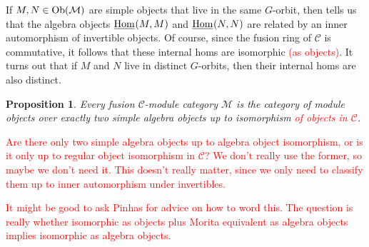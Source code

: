 \documentclass[12pt, reqno]{amsart}
\numberwithin{equation}{section}
\theoremstyle{plainspace}
\newtheorem{proposition}[theorem]{Proposition}
\theoremstyle{definitionspace}
\theoremstyle{remarkspace}
\newcommand{\mathcat}[1]{\mathcal{#1}}
\newcommand{\Ob}{\textup{Ob}}
\newcommand{\IntHom}[2][]{
	\ifthenelse{\equal{#2}{}}
		{\underline{\textup{Hom}}_{#1}}
		{\underline{\textup{Hom}}_{#1}\!\left(#2\right)}
}
\begin{document}
\newline

\noindent If $M, N \in \Ob(\mathcat{M})$ are simple objects that live in the same $G$-orbit, then \cite[Lemma 3.3]{Ostrik_2003} tells us that the algebra objects $\IntHom{M, M}$ and $\IntHom{N, N}$ are related by an inner automorphism of invertible objects. Of course, since the fusion ring of $\mathcat{C}$ is commutative, it follows that these internal homs are isomorphic \textcolor{red}{(as objects)}. It turns out that if $M$ and $N$ live in distinct $G$-orbits, then their internal homs are also distinct.
\newline

\begin{proposition}\label{prop:near-group_algebra_equivalence_classes}
Every fusion $\mathcat{C}$-module category $\mathcat{M}$ is the category of module objects over exactly two simple algebra objects up to isomorphism \textcolor{red}{of objects in $\mathcat{C}$}.
\end{proposition}
\leavevmode

\noindent \textcolor{red}{Are there only two simple algebra objects up to algebra object isomorphism, or is it only up to regular object isomorphism in $\mathcat{C}$? We don't really use the former, so maybe we don't need it. This doesn't really matter, since we only need to classify them up to inner automorphism under invertibles.}
\newline

\noindent \textcolor{red}{It might be good to ask Pinhas for advice on how to word this. The question is really whether isomorphic as objects plus Morita equivalent as algebra objects implies isomorphic as algebra objects.}
\newline
\end{document}
